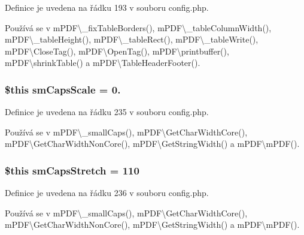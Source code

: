 Definice je uvedena na řádku 193 v souboru config.\-php.



Používá se v m\-P\-D\-F\textbackslash{}\-\_\-fix\-Table\-Borders(), m\-P\-D\-F\textbackslash{}\-\_\-table\-Column\-Width(), m\-P\-D\-F\textbackslash{}\-\_\-table\-Height(), m\-P\-D\-F\textbackslash{}\-\_\-table\-Rect(), m\-P\-D\-F\textbackslash{}\-\_\-table\-Write(), m\-P\-D\-F\textbackslash{}\-Close\-Tag(), m\-P\-D\-F\textbackslash{}\-Open\-Tag(), m\-P\-D\-F\textbackslash{}printbuffer(), m\-P\-D\-F\textbackslash{}shrink\-Table() a m\-P\-D\-F\textbackslash{}\-Table\-Header\-Footer().

\hypertarget{config_8php_ae2537b17eb881748faa8462abb132325}{
\subsubsection[{sm\-Caps\-Scale}]{\setlength{\rightskip}{0pt plus 5cm}\$this sm\-Caps\-Scale = 0.}}\label{config_8php_ae2537b17eb881748faa8462abb132325}


Definice je uvedena na řádku 235 v souboru config.\-php.



Používá se v m\-P\-D\-F\textbackslash{}\-\_\-small\-Caps(), m\-P\-D\-F\textbackslash{}\-Get\-Char\-Width\-Core(), m\-P\-D\-F\textbackslash{}\-Get\-Char\-Width\-Non\-Core(), m\-P\-D\-F\textbackslash{}\-Get\-String\-Width() a m\-P\-D\-F\textbackslash{}m\-P\-D\-F().

\hypertarget{config_8php_a93513ac3a0910cbbffea558bc5ceb8cb}{
\subsubsection[{sm\-Caps\-Stretch}]{\setlength{\rightskip}{0pt plus 5cm}\$this sm\-Caps\-Stretch = 110}}\label{config_8php_a93513ac3a0910cbbffea558bc5ceb8cb}


Definice je uvedena na řádku 236 v souboru config.\-php.



Používá se v m\-P\-D\-F\textbackslash{}\-\_\-small\-Caps(), m\-P\-D\-F\textbackslash{}\-Get\-Char\-Width\-Core(), m\-P\-D\-F\textbackslash{}\-Get\-Char\-Width\-Non\-Core(), m\-P\-D\-F\textbackslash{}\-Get\-String\-Width() a m\-P\-D\-F\textbackslash{}m\-P\-D\-F().

